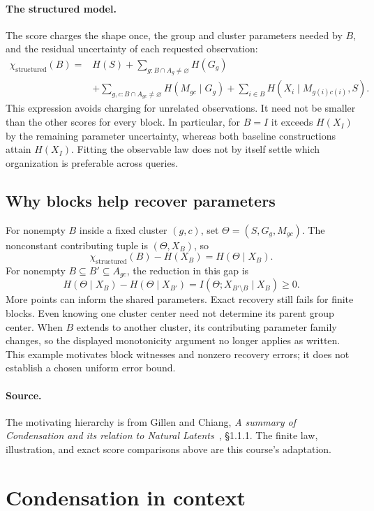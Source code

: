 \documentclass[11pt]{article}
\begin{document}
\paragraph{The structured model.}
The score charges the shape once, the group and cluster parameters needed by
$B$, and the residual uncertainty of each requested observation:
\[
\begin{aligned}
 \chi_{\mathrm{structured}}(B)={}&H(S)
 +\sum_{g:B\cap A_g\ne\varnothing}H(G_g)\\
 &+\sum_{g,c:B\cap A_{gc}\ne\varnothing}H(M_{gc}\mid G_g)
 +\sum_{i\in B}H(X_i\mid M_{g(i)c(i)},S).
\end{aligned}
\]
This expression avoids charging for unrelated observations. It need not be
smaller than the other scores for every block. In particular, for $B=I$ it
exceeds $H(X_I)$ by the remaining parameter uncertainty, whereas both baseline
constructions attain $H(X_I)$. Fitting the observable law does not by itself
settle which organization is preferable across queries.

\subsection{Why blocks help recover parameters}
For nonempty $B$ inside a fixed cluster $(g,c)$, set $\Theta=(S,G_g,M_{gc})$. The
nonconstant contributing tuple is $(\Theta,X_B)$, so
\[
 \chi_{\mathrm{structured}}(B)-H(X_B)=H(\Theta\mid X_B).
\]
For nonempty $B\subseteq B'\subseteq A_{gc}$, the reduction in this gap is
\[
 H(\Theta\mid X_B)-H(\Theta\mid X_{B'})
 =I(\Theta;X_{B'\setminus B}\mid X_B)\ge0.
\]
More points can inform the shared parameters. Exact recovery still fails for
finite blocks. Even knowing one cluster center need not determine its parent
group center. When $B$ extends to another cluster, its contributing parameter
family changes, so the displayed monotonicity argument no longer applies as
written. This example motivates block witnesses and nonzero recovery errors;
it does not establish a chosen uniform error bound.

\paragraph{Source.}
The motivating hierarchy is from Gillen and Chiang,
\emph{A summary of
Condensation and its relation to Natural Latents}~\citep{gillen2026summary}, \S1.1.1. The finite law,
illustration, and exact score comparisons above are this course's adaptation.

\section{Condensation in context}
\end{document}
